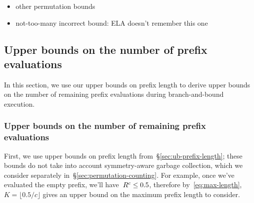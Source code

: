 
\begin{itemize}
\item other permutation bounds
\item not-too-many incorrect bound:  ELA doesn't remember this one
\end{itemize}






\subsection{Upper bounds on the number of prefix evaluations}

In this section, we use our upper bounds on prefix length to derive upper bounds on
the number of remaining prefix evaluations during branch-and-bound execution.

\subsubsection{Upper bounds on the number of remaining prefix evaluations}
\label{sec:ub-size}

First, we use upper bounds on prefix length from~\S\ref{sec:ub-prefix-length};
these bounds do not take into account symmetry-aware garbage collection,
which we consider separately in~\S\ref{sec:permutation-counting}.
%
For example, once we've evaluated the empty prefix, we'll have~${R^c \le 0.5}$,
therefore by~\eqref{eq:max-length}, ${K = \lfloor 0.5 / c \rfloor}$ gives
an upper bound on the maximum prefix length to consider.

